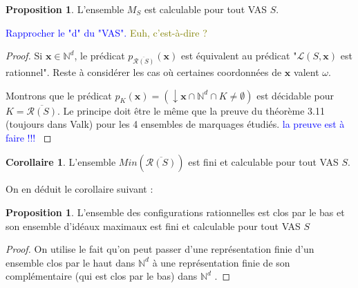 \documentclass[a4paper,final]{article}
\theoremstyle{definition}
\newtheorem{Proposition}[Theorem]{Proposition}
\newtheorem{Corollary}[Theorem]{Corollaire}
\newcommand{\alain}[1]{\textcolor{blue}{#1}}
\newcommand{\lucas}[1]{\textcolor{olive}{#1}}
\newcommand{\Min}{\textit{Min}}
\newcommand{\N}{\ensuremath{\mathbb{N}}}
\newcommand{\lang}{\ensuremath{\mathcal{L}}}
\newcommand{\vect}[1]{\ensuremath{\mathbf{#1}}}
\newcommand{\inirat}{\mathcal{R}}
\begin{document}
\begin{Proposition}\label{minimaux}
L'ensemble $M_S$ est calculable pour tout VAS $S$.

\alain{Rapprocher le "d" du "VAS".}
\lucas{Euh, c'est-à-dire ?}
\end{Proposition}

\begin{proof}
Si $\vect{x}\in\N^d$, le prédicat $p_{\overline{\inirat(S)}}(\vect{x})$ est équivalent au prédicat "$\lang(S,\vect{x})$ est rationnel".
Reste à considérer les cas où certaines coordonnées de $\vect{x}$ valent $\omega$.

Montrons que le prédicat $p_K(\vect{x})=(\downarrow \vect{x} \cap \N^d \cap K \neq \emptyset)$ est décidable pour $K=\overline{\inirat(S)}$. Le principe doit être le même que la preuve du théorème 3.11 (toujours dans Valk) pour les 4 ensembles de marquages étudiés.
\alain{la preuve est à faire !!! }
\end{proof}

\begin{Corollary}\label{minimaux_cor}
L'ensemble $\Min(\overline{\inirat(S)})$ est fini et calculable pour tout VAS $S$.
\end{Corollary}

On en déduit le corollaire suivant :

\begin{Proposition}\label{maximaux}
L'ensemble des configurations rationnelles est clos par le bas et son ensemble d'idéaux maximaux est fini et calculable pour tout VAS $S$ 
\end{Proposition}

\begin{proof}
On utilise le fait qu'on peut passer d'une représentation finie d'un ensemble clos par le haut dans $\N^d$ à une représentation finie de son complémentaire (qui est clos par le bas) dans $\N^d$ \cite{GHKNS-til2020}.

\end{proof}
\end{document}
